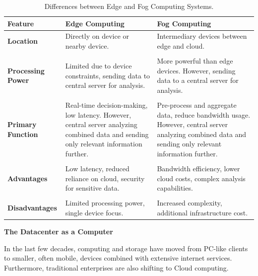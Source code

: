 \documentclass[a4paper]{article}
\begin{document}
    \begin{table}[!htp]
        \centering
        \begin{tabular}{@{} l p{11.5em} p{11.5em} @{}}
            \toprule
            \textbf{Feature} & \textbf{Edge Computing} & \textbf{Fog Computing} \\
            \midrule
            \textbf{Location} & Directly on device or nearby device. & Intermediary devices between edge and cloud. \\
            \\
            \textbf{Processing Power} & Limited due to device constraints, sending data to central server for analysis. & More powerful than edge devices. However, sending data to a central server for analysis. \\
            \\
            \textbf{Primary Function} & Real-time decision-making, low latency. However, central server analyzing combined data and sending only relevant information further. & Pre-process and aggregate data, reduce bandwidth usage. However, central server analyzing combined data and sending only relevant information further. \\
            \\
            \textbf{Advantages} & Low latency, reduced reliance on cloud, security for sensitive data. & Bandwidth efficiency, lower cloud costs, complex analysis capabilities. \\
            \\
            \textbf{Disadvantages} & Limited processing power, single device focus. & Increased complexity, additional infrastructure cost. \\
            \bottomrule
        \end{tabular}
        \caption{Differences between Edge and Fog Computing Systems.}
    \end{table}

    \newpage

    \begin{center}
        \textcolor{Red2}{\textbf{The Datacenter as a Computer}}
    \end{center}

    \noindent
    In the last few decades, computing and storage have moved from PC-like clients to smaller, often mobile, devices combined with extensive internet services. Furthermore, traditional enterprises are also shifting to Cloud computing.
\end{document}
